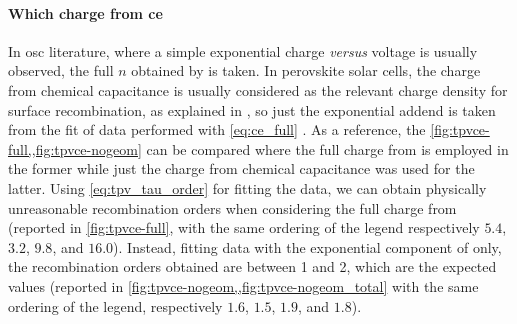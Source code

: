 \paragraph{Which charge from \gls{ce}}
In \gls{osc} literature, where a simple exponential charge \textsl{versus} voltage is usually observed, the full $n$ obtained by  is taken.
In perovskite solar cells, the charge from chemical capacitance is usually considered as the relevant charge density for surface recombination, as explained in , so just the exponential addend is taken from the fit of  data performed with \cref{eq:ce_full} \cite{Du2018,Gelmetti2019,Wheeler2017}.
As a reference, the \cref{fig:tpvce-full,,fig:tpvce-nogeom} can be compared where the full charge from  is employed in the former while just the charge from chemical capacitance was used for the latter.
Using \cref{eq:tpv_tau_order} for fitting the data, we can obtain physically unreasonable recombination orders when considering the full charge from  (reported in \cref{fig:tpvce-full}, with the same ordering of the legend respectively $5.4$, $3.2$, $9.8$, and $16.0$).
Instead, fitting data with the exponential component of  only, the recombination orders obtained are between 1 and 2, which are the expected values (reported in \cref{fig:tpvce-nogeom,,fig:tpvce-nogeom_total} with the same ordering of the legend, respectively $1.6$, $1.5$, $1.9$, and $1.8$).

